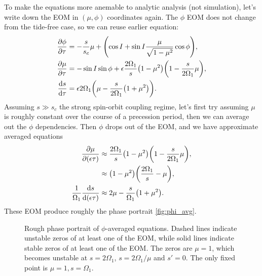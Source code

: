 \documentclass[11pt,
        usenames, %
        dvipsnames %
    ]{article}
\newcommand*{\rd}[2]{\frac{\mathrm{d}#1}{\mathrm{d}#2}}
\newcommand*{\pd}[2]{\frac{\partial#1}{\partial#2}}
\DeclarePairedDelimiter\p{\lparen}{\rparen}
\begin{document}
To make the equations more anemable to analytic analysis (not simulation), let's
write down the EOM in $(\mu, \phi)$ coordinates again. The $\phi$ EOM does not
change from the tide-free case, so we can reuse earlier equation:
\begin{align}
    \pd{\phi}{\tau} &= -\frac{s}{s_c}\mu
        + \p*{\cos I + \sin I \frac{\mu}{\sqrt{1 - \mu^2}} \cos \phi} ,\\
    \pd{\mu}{\tau} &= -\sin I \sin \phi +
        \epsilon \frac{2\Omega_1}{s}\p*{1 - \mu^2}
            \p*{1 - \frac{s}{2\Omega_1}\mu},\\
    \rd{s}{\tau}
        &= \epsilon 2\Omega_1 \p*{\mu - \frac{s}{2\Omega_1}\p*{1 + \mu^2}}.
\end{align}
Assuming $s \gg s_c$ the strong spin-orbit coupling regime, let's first try
assuming $\mu$ is roughly constant over the course of a precession period, then
we can average out the $\phi$ dependencies. Then $\phi$ drops out of the EOM,
and we have approximate averaged equations
\begin{subequations}\label{se:prec_avg}
    \begin{align}
        \pd{\mu}{(\epsilon\tau)} &\approx \frac{2\Omega_1}{s}\p*{1 - \mu^2}
                \p*{1 - \frac{s}{2\Omega_1}\mu},\nonumber\\
            &\approx \p*{1 - \mu^2}
                \p*{\frac{2\Omega_1}{s} - \mu},\\
        \frac{1}{\Omega_1}\rd{s}{(\epsilon\tau)}
            &\approx 2\mu - \frac{s}{\Omega_1}\p*{1 + \mu^2}.
    \end{align}
\end{subequations}
These EOM produce roughly the phase portrait \autoref{fig:phi_avg}.
\begin{figure}[t]
    \centering
    \caption{Rough phase portrait of $\phi$-averaged equations. Dashed lines
    indicate unstable zeros of at least one of the EOM, while solid lines
    indicate stable zeros of at least one of the EOM\@. The zeros are $\mu = 1$,
    which becomes unstable at $s = 2\Omega_1$, $s = 2\Omega_1/\mu$ and $s' = 0$.
    The only fixed point is $\mu = 1, s = \Omega_1$.}\label{fig:phi_avg}
\end{figure}
\end{document}
